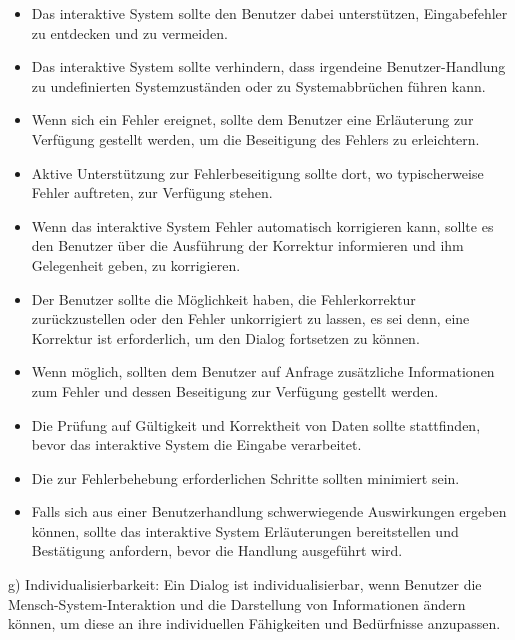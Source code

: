 \begin{itemize}
	\item Das interaktive System sollte den Benutzer dabei unterstützen, Eingabefehler zu entdecken und zu
	vermeiden.
	\item Das interaktive System sollte verhindern, dass irgendeine Benutzer-Handlung zu undefinierten
	Systemzuständen oder zu Systemabbrüchen führen kann.
	\item Wenn sich ein Fehler ereignet, sollte dem Benutzer eine Erläuterung zur Verfügung gestellt werden,
	um die Beseitigung des Fehlers zu erleichtern.
	\item Aktive Unterstützung zur Fehlerbeseitigung sollte dort, wo typischerweise Fehler auftreten, zur
	Verfügung stehen.
	\item Wenn das interaktive System Fehler automatisch korrigieren kann, sollte es den Benutzer über die
	Ausführung der Korrektur informieren und ihm Gelegenheit geben, zu korrigieren.
	\item Der Benutzer sollte die Möglichkeit haben, die Fehlerkorrektur zurückzustellen oder den Fehler
	unkorrigiert zu lassen, es sei denn, eine Korrektur ist erforderlich, um den Dialog fortsetzen zu können.
	\item Wenn möglich, sollten dem Benutzer auf Anfrage zusätzliche Informationen zum Fehler und dessen
	Beseitigung zur Verfügung gestellt werden.
	\item Die Prüfung auf Gültigkeit und Korrektheit von Daten sollte stattfinden, bevor das interaktive System
	die Eingabe verarbeitet.
	\item Die zur Fehlerbehebung erforderlichen Schritte sollten minimiert sein.
	\item Falls sich aus einer Benutzerhandlung schwerwiegende Auswirkungen ergeben können, sollte das
	interaktive System Erläuterungen bereitstellen und Bestätigung anfordern, bevor die Handlung ausgeführt
	wird.
\end{itemize}
g) Individualisierbarkeit:\newline
Ein Dialog ist individualisierbar, wenn Benutzer die Mensch-System-Interaktion und die Darstellung von
Informationen ändern können, um diese an ihre individuellen Fähigkeiten und Bedürfnisse anzupassen.
